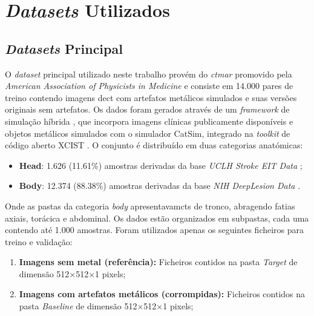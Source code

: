 \section{\textit{Datasets} Utilizados}
\subsection{\textit{Datasets} Principal}
O \textit{dataset} principal utilizado neste trabalho provém do \textit{\acrfull{ctmar}} \cite{hanedaAAPMCTMetal2025, AAPMCTMARBenchmarkTool} promovido pela \textit{American Association of Physicists in Medicine} e consiste em 14.000 pares de treino contendo imagens de\acrshort{ct} com artefatos metálicos simulados e suas versões originais sem artefatos. Os dados foram gerados através de um \textit{framework} de simulação híbrida \cite{petersHybridTrainingDatabase2025}, que incorpora imagens clínicas publicamente disponíveis e objetos metálicos simulados com o simulador CatSim, integrado na \textit{toolkit} de código aberto XCIST \cite{wuXCISTOpenAccess2022}. O conjunto é distribuído em duas categorias anatómicas:

\begin{itemize}
    \item \textbf{Head}: 1.626 (11.61\%) amostras derivadas da base \textit{UCLH Stroke EIT Data} \cite{gorenMultifrequencyElectricalImpedance2018, gorenUCLHStrokeEIT2017};
    \item \textbf{Body}: 12.374 (88.38\%) amostras derivadas da base \textit{NIH DeepLesion Data} \cite{yanDeepLesionAutomatedMining2018}.
\end{itemize}

Onde as pastas da categoria \textit{body} apresentavam\acrshort{ct}s de tronco, abragendo fatias axiais, torácica e abdominal. Os dados estão organizados em subpastas, cada uma contendo até 1.000 amostras. Foram utilizados apenas os seguintes ficheiros para treino e validação:

\begin{enumerate}
    \item \textbf{Imagens sem metal (referência):} Ficheiros contidos na pasta \textit{Target} de dimensão 512×512×1 pixels;
    \item \textbf{Imagens com artefatos metálicos (corrompidas):} Ficheiros contidos na pasta \textit{Baseline} de dimensão 512×512×1 pixels;
\end{enumerate}

